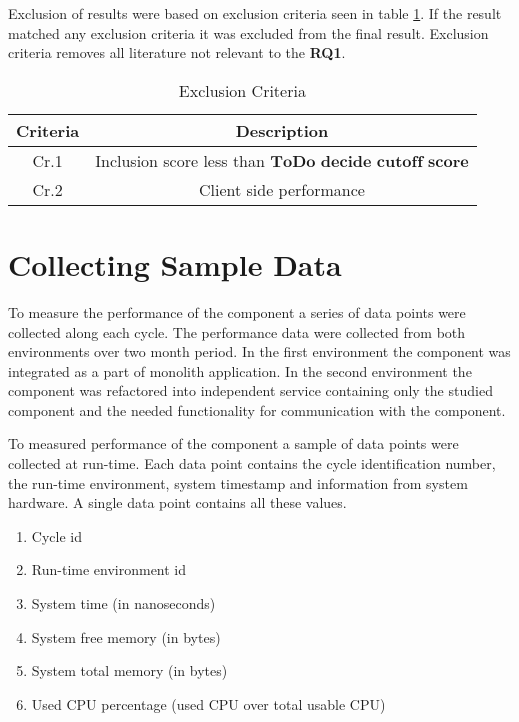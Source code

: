 Exclusion of results were based on exclusion criteria seen in table \ref{table:literature:exclusionCriteria}.
If the result matched any exclusion criteria it was excluded from the final result.
Exclusion criteria removes all literature not relevant to the \textbf{RQ1}.

\begin{table}[h!]
    \begin{tabular}{|c c|} 
        \hline
        Criteria & Description \\ [0.5ex] 
        \hline
        Cr.1 & Inclusion score less than $\textbf{ToDo decide cutoff score}$ \\
        \hline
        Cr.2 & Client side performance  \\
        \hline
    \end{tabular}    
    \caption{Exclusion Criteria}
    \label{table:literature:exclusionCriteria}
\end{table}

\section{Collecting Sample Data}
To measure the performance of the component a series of data points were collected along each cycle.
The performance data were collected from both environments over two month period.
In the first environment the component was integrated as a part of monolith application.
In the second environment the component was refactored into independent service containing only the studied component and the needed functionality for communication with the component.

To measured performance of the component a sample of data points were collected at run-time.
Each data point contains the cycle identification number, the run-time environment, system timestamp and information from system hardware.
A single data point contains all these values.
\begin{enumerate}
    \item Cycle id
    \item Run-time environment id
    \item System time (in nanoseconds)
    \item System free memory (in bytes)
    \item System total memory (in bytes)
    \item Used CPU percentage (used CPU over total usable CPU)
\end{enumerate}

